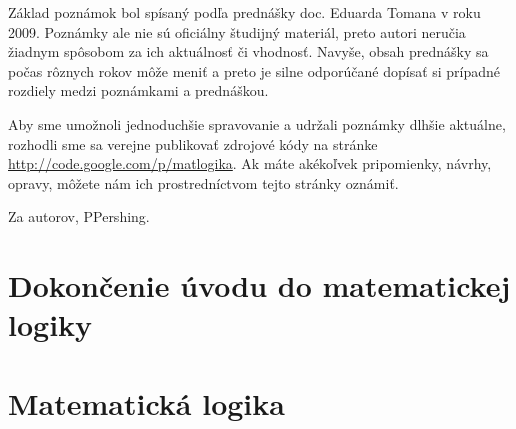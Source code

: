 \documentclass[a4paper]{report}
\begin{document}
Základ poznámok bol spísaný podľa prednášky doc. Eduarda Tomana v roku 2009.
Poznámky ale nie sú oficiálny študijný materiál, preto autori neručia
žiadnym spôsobom za ich aktuálnosť či vhodnosť. Navyše, obsah prednášky sa
počas rôznych rokov môže meniť a preto je silne odporúčané dopísať si
prípadné rozdiely medzi poznámkami a prednáškou.

Aby sme umožnoli jednoduchšie spravovanie a udržali poznámky dlhšie
aktuálne, rozhodli sme sa verejne publikovať zdrojové kódy na stránke
\url{http://code.google.com/p/matlogika}. Ak máte akékoľvek pripomienky,
návrhy, opravy, môžete nám ich prostredníctvom tejto stránky oznámiť.

Za autorov, PPershing.

\tableofcontents

\chapter{Dokončenie úvodu do matematickej logiky}





\chapter{Matematická logika}




\end{document}
